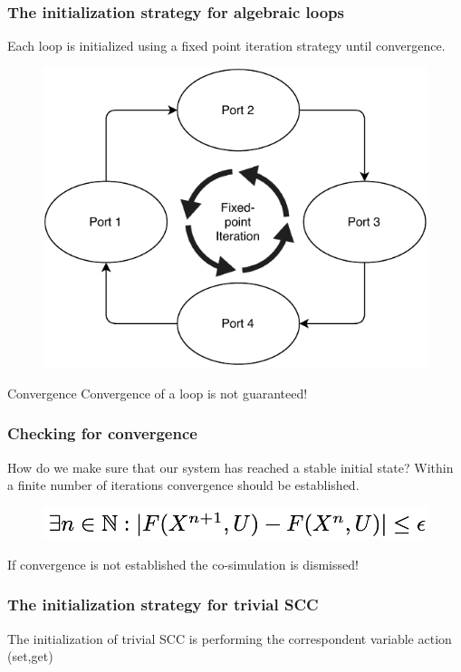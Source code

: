 \documentclass{beamer}
\begin{document}
\begin{frame}
\frametitle{The initialization strategy for algebraic loops}
    Each loop is initialized using a fixed point iteration strategy until convergence.
    
\begin{figure}
    \centering
    \includegraphics[scale=0.6]{images/ExpansionPlugin-Page-4.pdf}
\end{figure}
    
\begin{alertblock}{Convergence}
    Convergence of a loop is not guaranteed!
\end{alertblock}
    
\end{frame}

\begin{frame}
\frametitle{Checking for convergence}
How do we make sure that our system has reached a stable initial state?
Within a finite number of iterations convergence should  be established.
\begin{figure}
    \centering
    \includegraphics[scale=0.3]{images/Screenshot 2020-09-09 at 20.51.28.png}
\end{figure}

If convergence is not established the co-simulation is dismissed!
\end{frame}

\begin{frame}
\frametitle{The initialization strategy for trivial SCC}
The initialization of trivial SCC is performing the correspondent variable action (set,get) 
    
\end{frame}
\end{document}
